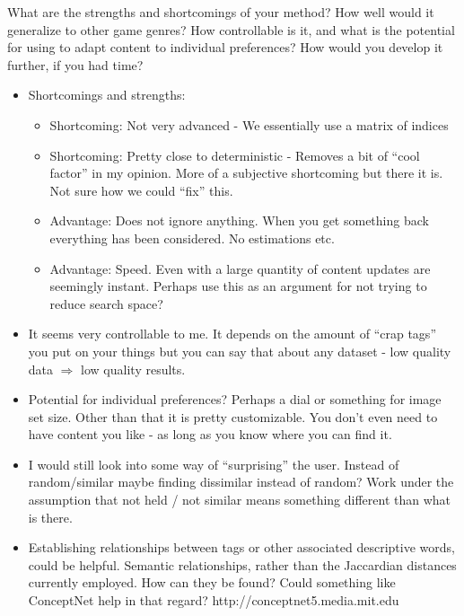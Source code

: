 \documentclass[]{article}
\begin{document}
\begin{framed}
What are the strengths and shortcomings of your method? How well would it generalize to other game genres? How controllable is it, and what is the potential for using to adapt content to individual preferences? How would you develop it further, if you had time?
\end{framed}
\begin{itemize}
\item Shortcomings and strengths:
	\begin{itemize}
	\item Shortcoming: Not very advanced - We essentially use a matrix of indices
	\item Shortcoming: Pretty close to deterministic - Removes a bit of ``cool factor'' in my opinion. More of a subjective shortcoming but there it is. Not sure how we could ``fix'' this.
	\item Advantage: Does not ignore anything. When you get something back everything has been considered. No estimations etc.
	\item Advantage: Speed. Even with a large quantity of content updates are seemingly instant. Perhaps use this as an argument for not trying to reduce search space?
	\end{itemize}
\item  It seems very controllable to me. It depends on the amount of ``crap tags'' you put on your things but you can say that about any dataset - low quality data $\Rightarrow$ low quality results. 
\item Potential for individual preferences? Perhaps a dial or something for image set size. Other than that it is pretty customizable. You don't even need to have content you like - as long as you know where you can find it.
\item I would still look into some way of ``surprising'' the user. Instead of random/similar maybe finding dissimilar instead of random? Work under the assumption that not held / not similar means something different than what is there.

\item Establishing relationships between tags or other associated descriptive words, could be helpful. Semantic relationships, rather than the Jaccardian distances currently employed.  How can they be found?  Could something like ConceptNet help in that regard?  http://conceptnet5.media.mit.edu  

\end{itemize}
\end{document}
